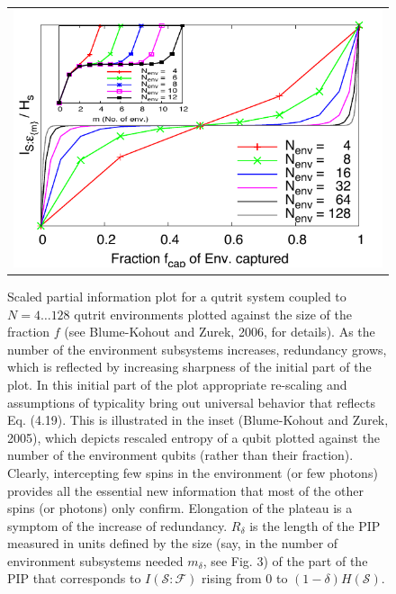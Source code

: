 \documentclass[aps,rmp,epsfig,11pt]{revtex4}
\def\FCW{0.98\columnwidth}
\newcommand{\cS}        {{\mathcal S}}
\newcommand{\+}         {\dagger}
\newcommand\cF{{\mathcal F}}
\begin{document}
{\begin{figure}[tb]
\begin{tabular}{l}
\vspace{-0.15in} 
\includegraphics[width=\FCW]{NSPIPs_3x3.pdf}\\
\end{tabular}
\caption{Scaled partial information plot for a qutrit system coupled to $N=4\ldots128$ qutrit 
environments plotted against the size of the fraction $f$ (see Blume-Kohout and Zurek, 2006, 
for details). As the number of the environment subsystems increases, redundancy grows, which 
is reflected by increasing sharpness of the initial part of the plot. In this initial part of the plot 
appropriate re-scaling and assumptions of typicality bring out universal behavior that reflects 
Eq. (4.19). This is illustrated in the inset (Blume-Kohout and Zurek, 2005), which depicts rescaled 
entropy of a qubit plotted against the number of the environment qubits (rather than their fraction). Clearly, intercepting few 
spins in the environment (or few photons) provides all the essential new information that most 
of the other spins (or photons) only confirm. Elongation of the plateau is a symptom of the increase 
of redundancy. $R_\delta$ is the length of the PIP measured in units defined by the size 
(say, in the number of environment subsystems needed $m_\delta$, see Fig. 3) of the part  
of the PIP that corresponds to $I(\cS:\cF)$ rising from 0 to $(1-\delta) H(\cS)$. 
}
\label{SpinPIP}
\end{figure}


}
\end{document}
